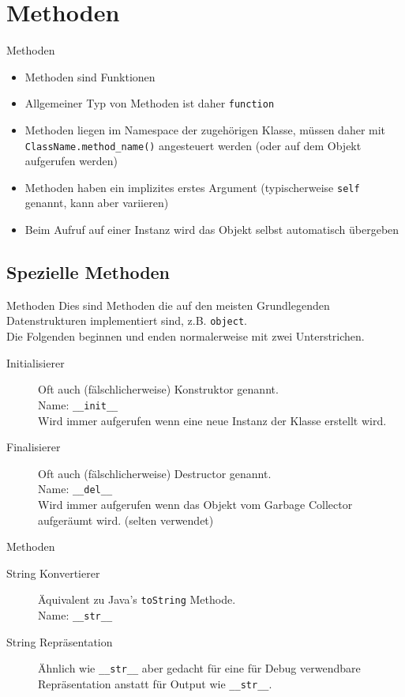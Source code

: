 \section{Methoden}
\begin{frame}[fragile]{Methoden}
	\begin{itemize}
		\item Methoden sind Funktionen
		\item Allgemeiner Typ von Methoden ist daher \alert{\texttt{function}}
		\item Methoden liegen im Namespace der zugehörigen Klasse, müssen daher mit \alert{\texttt{ClassName.method\_name()}} angesteuert werden (oder auf dem Objekt aufgerufen werden)
		\item Methoden haben ein implizites erstes Argument (typischerweise \texttt{self} genannt, kann aber variieren)
		\item Beim Aufruf auf einer Instanz wird das Objekt selbst automatisch übergeben
	\end{itemize}
\end{frame}


\subsection{Spezielle Methoden}
\begin{frame}[fragile]{Methoden}
	Dies sind Methoden die auf den meisten Grundlegenden Datenstrukturen implementiert sind, z.B. \texttt{object}.\\
	Die Folgenden beginnen und enden normalerweise mit zwei Unterstrichen.

	\begin{description}
		\item[Initialisierer] Oft auch (fälschlicherweise) Konstruktor genannt.\\ Name: \alert{\texttt{\_\_init\_\_}}\\
			Wird immer aufgerufen wenn eine neue Instanz der Klasse erstellt wird.
		\item[Finalisierer] Oft auch (fälschlicherweise) Destructor genannt.\\
			Name: \alert{\texttt{\_\_del\_\_}}\\
			Wird immer aufgerufen wenn das Objekt vom Garbage Collector aufgeräumt wird. (selten verwendet)
	\end{description}
\end{frame}

\begin{frame}[fragile]{Methoden}
    \begin{description}
		\item[String Konvertierer] Äquivalent zu Java's \texttt{toString} Methode. \\ Name: \alert{\texttt{\_\_str\_\_}}
		\item[String Repräsentation] Ähnlich wie \alert{\texttt{\_\_str\_\_}} aber gedacht für eine für Debug verwendbare Repräsentation anstatt für Output wie \alert{\texttt{\_\_str\_\_}}.
	\end{description}
\end{frame}






